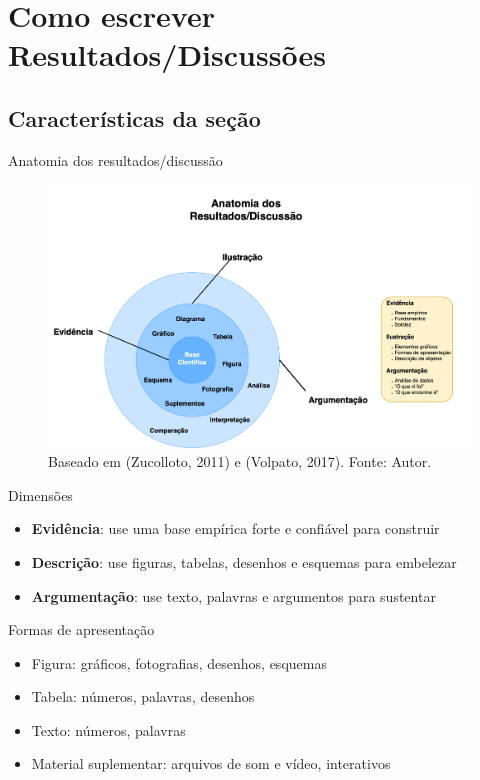 
\section{Como escrever Resultados/Discussões}

\subsection{Características da seção}

\begin{frame}{Anatomia dos resultados/discussão}
\begin{figure}
\centering
\includegraphics[scale=0.14]{figs/07/resultados-discussao}
\caption{Baseado em (Zucolloto, 2011) e (Volpato, 2017). Fonte: Autor.}
\end{figure}
\end{frame}

\begin{frame}{Dimensões}
\begin{itemize}
\item \textbf{Evidência}: use uma base empírica forte e confiável para construir 
\item \textbf{Descrição}: use figuras, tabelas, desenhos e esquemas para embelezar
\item \textbf{Argumentação}: use texto, palavras e argumentos para sustentar
\end{itemize}
\end{frame}

\begin{frame}{Formas de apresentação}
\begin{itemize}
\item Figura: gráficos, fotografias, desenhos, esquemas
\item Tabela: números, palavras, desenhos
\item Texto: números, palavras
\item Material suplementar: arquivos de som e vídeo, interativos 
\end{itemize}
\end{frame}

